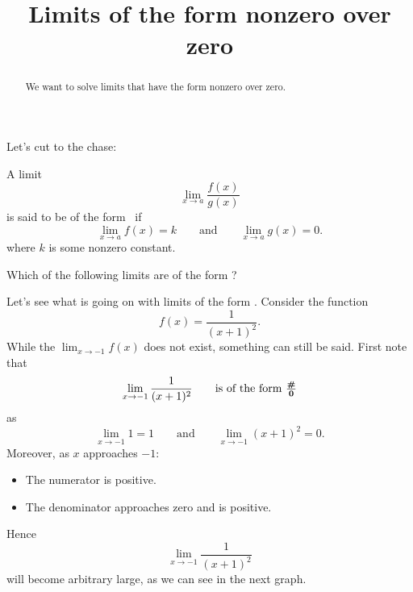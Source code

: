 \documentclass{ximera}
\title[Dig-In:]{Limits of the form nonzero over zero}
\begin{document}
\begin{abstract}
  We want to solve limits that have the form nonzero over zero.
\end{abstract}

\maketitle

Let's cut to the chase:

\begin{definition}
  A limit
  \[
  \lim_{x\to a} \frac{f(x)}{g(x)}
  \]
  is said to be of the form \numOverZero\ if
  \[
  \lim_{x\to a} f(x) = k\qquad\text{and}\qquad \lim_{x\to a} g(x) =0.
  \]
  where $k$ is some nonzero constant.
\end{definition}

\begin{problem}
  Which of the following limits are of the form \numOverZero?
  \begin{selectAll}
  \end{selectAll}
\end{problem}


Let's see what is going on with limits of the form \numOverZero.
Consider the function
  \[
  f(x) = \frac{1}{(x+1)^2}.
  \]
While the $\lim_{x\to -1} f(x)$ does not exist, something can still be
said. First note that
\[
\lim_{x\to -1} \frac{1}{(x+1)^2}\qquad\text{is of the form }\boldsymbol{\tfrac{\#}{0}}
\]
as
\[
\lim_{x\to -1} 1 = 1 \qquad\text{and}\qquad \lim_{x\to -1}(x+1)^2 = 0.
\]
Moreover, as $x$ approaches $-1$:
\begin{itemize}
\item The numerator is positive.
\item The denominator approaches zero and is positive.
\end{itemize}
Hence
\[
\lim_{x\to -1} \frac{1}{(x+1)^2}
\]
will become arbitrary large, as we can see in the next graph.
\begin{image}
\end{image}
\end{document}
